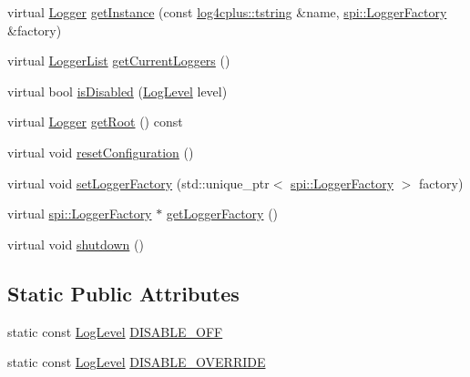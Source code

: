 \begin{DoxyCompactItemize}
\item 
virtual \hyperlink{classlog4cplus_1_1Logger}{Logger} \hyperlink{classlog4cplus_1_1Hierarchy_a5ce0f3f345617d4073cdf3fbbb43d31a}{get\-Instance} (const \hyperlink{namespacelog4cplus_a3c9287f6ebcddc50355e29d71152117b}{log4cplus\-::tstring} \&name, \hyperlink{classlog4cplus_1_1spi_1_1LoggerFactory}{spi\-::\-Logger\-Factory} \&factory)
\item 
virtual \hyperlink{namespacelog4cplus_a9bad705b454c9c31bd84d97837fec22f}{Logger\-List} \hyperlink{classlog4cplus_1_1Hierarchy_a0bac7879e92fe670563c251e406178ba}{get\-Current\-Loggers} ()
\item 
virtual bool \hyperlink{classlog4cplus_1_1Hierarchy_ad1c99cd9a4b145b21628340ea52d5448}{is\-Disabled} (\hyperlink{namespacelog4cplus_abd332cc8c98fefcbbdcf57b6b3867de9}{Log\-Level} level)
\item 
virtual \hyperlink{classlog4cplus_1_1Logger}{Logger} \hyperlink{classlog4cplus_1_1Hierarchy_ac6b0296fd70ba66144a33ab3c30a6398}{get\-Root} () const 
\item 
virtual void \hyperlink{classlog4cplus_1_1Hierarchy_aa85b45cef82941012cd1d0f4a8ac89b8}{reset\-Configuration} ()
\item 
virtual void \hyperlink{classlog4cplus_1_1Hierarchy_a679503bfae305c532a39e17b2bdc20e4}{set\-Logger\-Factory} (std\-::unique\-\_\-ptr$<$ \hyperlink{classlog4cplus_1_1spi_1_1LoggerFactory}{spi\-::\-Logger\-Factory} $>$ factory)
\item 
virtual \hyperlink{classlog4cplus_1_1spi_1_1LoggerFactory}{spi\-::\-Logger\-Factory} $\ast$ \hyperlink{classlog4cplus_1_1Hierarchy_ac31bd5c5bac279fb803a6d7aa47fcd99}{get\-Logger\-Factory} ()
\item 
virtual void \hyperlink{classlog4cplus_1_1Hierarchy_a8444b6eacb26763e0c52983ddf2bcb7c}{shutdown} ()
\end{DoxyCompactItemize}
\subsection*{Static Public Attributes}
\begin{DoxyCompactItemize}
\item 
static const \hyperlink{namespacelog4cplus_abd332cc8c98fefcbbdcf57b6b3867de9}{Log\-Level} \hyperlink{classlog4cplus_1_1Hierarchy_ab772d872d4d7d11946a87580cff29f55}{D\-I\-S\-A\-B\-L\-E\-\_\-\-O\-F\-F}
\item 
static const \hyperlink{namespacelog4cplus_abd332cc8c98fefcbbdcf57b6b3867de9}{Log\-Level} \hyperlink{classlog4cplus_1_1Hierarchy_aec08bdb25b4dd2c8003afd821b7c7eca}{D\-I\-S\-A\-B\-L\-E\-\_\-\-O\-V\-E\-R\-R\-I\-D\-E}
\end{DoxyCompactItemize}

